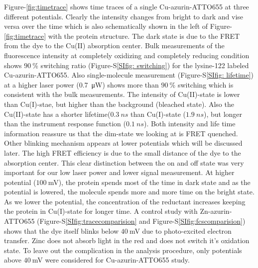 \documentclass[journal=jacsat,manuscript=article]{achemso}
\begin{document}
Figure-\ref{fig:timetrace} shows time traces of a single Cu-azurin-ATTO655 at three different potentials. Clearly the intensity changes from bright to dark and vise versa over the time which is also schematically shown in the left of Figure-\ref{fig:timetrace} with the protein structure. The dark state is due to the FRET from the dye to the Cu(II) absorption center\cite{kuznetsova2006a}. Bulk measurements of the fluorescence intensity at completely oxidizing and completely reducing condition shows $90~$\% switching ratio (Figure-S\ref{SIfig: switching}) for the lysine-122\cite{nicolardi2012topdown} labeled Cu-azurin-ATTO655. Also single-molecule measurement (Figure-S\ref{SIfig: lifetime}) at a higher laser power (\SI{0.7}{\micro\watt}) shows more than $90~$\% switching which is consistent with the bulk measurements. The intensity of Cu(II)-state is lower than Cu(I)-stae, but higher than the background (bleached state). Also the Cu(II)-state has a shorter lifetime($0.3~ns$ than Cu(I)-state ($1.9~ns$), but longer than the instrument response function ($0.1~ns$). Both intensity and life time information reassure us that the dim-state we looking at is FRET quenched. Other blinking mechanism appears at lower potentials which will be discussed later. The high FRET efficiency is due to the small distance of the dye to the absorption center. This clear distinction between the on and off state was very important for our low laser power and lower signal measurement. At higher potential ($100~$mV), the protein spends most of the time in dark state and as the potential is lowered, the molecule spends more and more time on the bright state. As we lower the potential, the concentration of the reductant increases keeping the protein in Cu(I)-state for longer time. A control study with Zn-azurin-ATTO655 (Figure-S\ref{SIfig:tracecomparision} and Figure-S\ref{SIfig:fcscomparision}) shows that the dye itself blinks below $40~$mV due to photo-excited electron transfer. Zinc does not absorb light in the red and does not switch it's oxidation state. To leave out the complication in the analysis procedure, only potentials above $40~$mV were considered for Cu-azurin-ATTO655 study.\\
\end{document}
